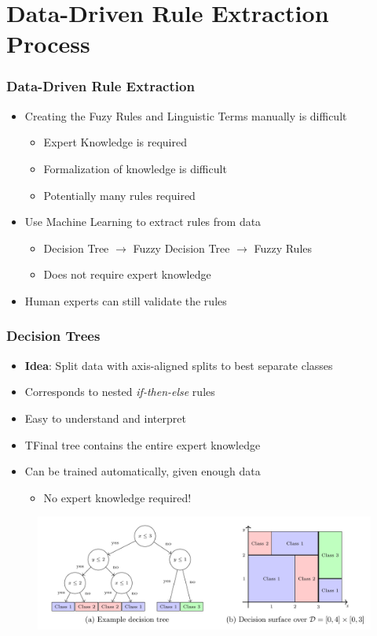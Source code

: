 \documentclass[
	10pt,
	t		%
]{beamer}
\begin{document}
\section{Data-Driven Rule Extraction Process}
\begin{frame}
	\frametitle{Data-Driven Rule Extraction}
	\begin{itemize}
		\item Creating the Fuzy Rules and Linguistic Terms manually is difficult
		      \begin{itemize}
			      \item Expert Knowledge is required
			      \item Formalization of knowledge is difficult
			      \item Potentially many rules required
		      \end{itemize}
		\item Use Machine Learning to extract rules from data
		      \begin{itemize}
			      \item Decision Tree $\rightarrow$ Fuzzy Decision Tree $\rightarrow$ Fuzzy Rules {\footnotesize \cite{CROCKETT20062809}}
			      \item Does not require expert knowledge
		      \end{itemize}
		\item Human experts can still validate the rules
	\end{itemize}
\end{frame}

\begin{frame}
	\frametitle{Decision Trees}

	\begin{itemize}
		\item \textbf{Idea}: Split data with axis-aligned splits to best separate classes
		\item Corresponds to nested \textit{if-then-else} rules
		\item Easy to understand and interpret
		\item TFinal tree contains the entire expert knowledge
		\item Can be trained automatically, given enough data
		      \begin{itemize}
			      \item No expert knowledge required!
		      \end{itemize}
	\end{itemize}

	\begin{figure}
		\centering
		\includegraphics[width=1\textwidth]{figures/decision-tree.png}
	\end{figure}

\end{frame}
\end{document}
